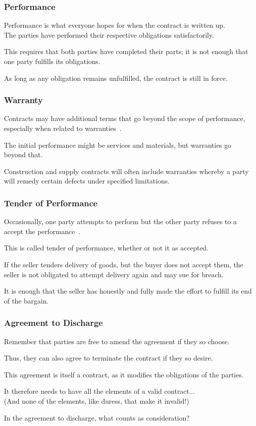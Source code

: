 \begin{frame}
\frametitle{Performance}

Performance is what everyone hopes for when the contract is written up.\\
\quad The parties have performed their respective obligations satisfactorily.

This requires that both parties have completed their parts; it is not enough that one party fulfills its obligations.

As long as any obligation remains unfulfilled, the contract is still in force.

\end{frame}



\begin{frame}
\frametitle{Warranty}

Contracts may have additional terms that go beyond the scope of performance, especially when related to warranties~\cite{lpe}.

The initial performance might be services and materials, but warranties go beyond that.

Construction and supply contracts will often include warranties whereby a party will remedy certain defects under specified limitations.

\end{frame}



\begin{frame}
\frametitle{Tender of Performance}

Occasionally, one party attempts to perform but the other party refuses to a accept the performance~\cite{lba}.

This is called \alert{tender of performance}, whether or not it as accepted.

If the seller tenders delivery of goods, but the buyer does not accept them, the seller is not obligated to attempt delivery again and may sue for breach.

It is enough that the seller has honestly and fully made the effort to fulfill its end of the bargain.

\end{frame}


\begin{frame}
\frametitle{Agreement to Discharge}

Remember that parties are free to amend the agreement if they so choose.

Thus, they can also agree to terminate the contract if they so desire.

This agreement is itself a contract, as it modifies the obligations of the parties.

It therefore needs to have all the elements of a valid contract...\\
\quad (And none of the elements, like duress, that make it invalid!)

In the agreement to discharge, what counts as consideration?

\end{frame}



